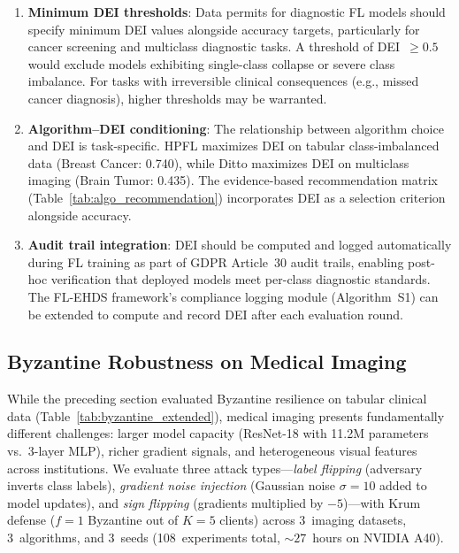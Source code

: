\documentclass[conference]{IEEEtran}
\begin{document}
\begin{enumerate}
    \item \textbf{Minimum DEI thresholds}: Data permits for diagnostic FL models should specify minimum DEI values alongside accuracy targets, particularly for cancer screening and multiclass diagnostic tasks. A threshold of DEI~$\geq 0.5$ would exclude models exhibiting single-class collapse or severe class imbalance. For tasks with irreversible clinical consequences (e.g., missed cancer diagnosis), higher thresholds may be warranted.
    \item \textbf{Algorithm--DEI conditioning}: The relationship between algorithm choice and DEI is task-specific. HPFL maximizes DEI on tabular class-imbalanced data (Breast Cancer: 0.740), while Ditto maximizes DEI on multiclass imaging (Brain Tumor: 0.435). The evidence-based recommendation matrix (Table~\ref{tab:algo_recommendation}) incorporates DEI as a selection criterion alongside accuracy.
    \item \textbf{Audit trail integration}: DEI should be computed and logged automatically during FL training as part of GDPR Article~30 audit trails, enabling post-hoc verification that deployed models meet per-class diagnostic standards. The FL-EHDS framework's compliance logging module (Algorithm~S1) can be extended to compute and record DEI after each evaluation round.
\end{enumerate}


\subsection{Byzantine Robustness on Medical Imaging}
\label{sec:byzantine_imaging}

While the preceding section evaluated Byzantine resilience on tabular clinical data (Table~\ref{tab:byzantine_extended}), medical imaging presents fundamentally different challenges: larger model capacity (ResNet-18 with 11.2M parameters vs.\ 3-layer MLP), richer gradient signals, and heterogeneous visual features across institutions. We evaluate three attack types---\textit{label flipping} (adversary inverts class labels), \textit{gradient noise injection} (Gaussian noise $\sigma{=}10$ added to model updates), and \textit{sign flipping} (gradients multiplied by $-5$)---with Krum defense ($f{=}1$ Byzantine out of $K{=}5$ clients) across 3~imaging datasets, 3~algorithms, and 3~seeds (108~experiments total, ${\sim}27$~hours on NVIDIA A40).
\end{document}
